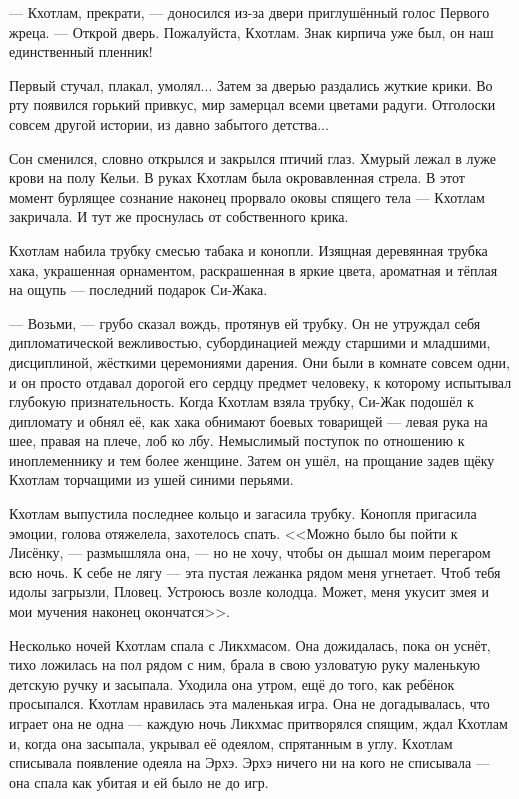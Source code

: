 --- Кхотлам, прекрати, --- доносился из-за двери приглушённый голос Первого жреца.
--- Открой дверь.
Пожалуйста, Кхотлам.
Знак кирпича уже был, он наш единственный пленник!

Первый стучал, плакал, умолял...
Затем за дверью раздались жуткие крики.
Во рту появился горький привкус, мир замерцал всеми цветами радуги.
Отголоски совсем другой истории, из давно забытого детства...

Сон сменился, словно открылся и закрылся птичий глаз.
Хмурый лежал в луже крови на полу Кельи.
В руках Кхотлам была окровавленная стрела.
В этот момент бурлящее сознание наконец прорвало оковы спящего тела --- Кхотлам закричала.
И тут же проснулась от собственного крика.

Кхотлам набила трубку смесью табака и конопли.
Изящная деревянная трубка хака, украшенная орнаментом, раскрашенная в яркие цвета, ароматная и тёплая на ощупь --- последний подарок Си-Жака.

--- Возьми, --- грубо сказал вождь, протянув ей трубку.
Он не утруждал себя дипломатической вежливостью, субординацией между старшими и младшими, дисциплиной, жёсткими церемониями дарения.
Они были в комнате совсем одни, и он просто отдавал дорогой его сердцу предмет человеку, к которому испытывал глубокую признательность.
Когда Кхотлам взяла трубку, Си-Жак подошёл к дипломату и обнял её, как хака обнимают боевых товарищей --- левая рука на шее, правая на плече, лоб ко лбу.
Немыслимый поступок по отношению к иноплеменнику и тем более женщине.
Затем он ушёл, на прощание задев щёку Кхотлам торчащими из ушей синими перьями.

Кхотлам выпустила последнее кольцо и загасила трубку.
Конопля пригасила эмоции, голова отяжелела, захотелось спать.
<<Можно было бы пойти к Лисёнку, --- размышляла она, --- но не хочу, чтобы он дышал моим перегаром всю ночь.
К себе не лягу --- эта пустая лежанка рядом меня угнетает.
Чтоб тебя идолы загрызли, Пловец.
Устроюсь возле колодца.
Может, меня укусит змея и мои мучения наконец окончатся>>.

Несколько ночей Кхотлам спала с Ликхмасом.
Она дожидалась, пока он уснёт, тихо ложилась на пол рядом с ним, брала в свою узловатую руку маленькую детскую ручку и засыпала.
Уходила она утром, ещё до того, как ребёнок просыпался.
Кхотлам нравилась эта маленькая игра.
Она не догадывалась, что играет она не одна --- каждую ночь Ликхмас притворялся спящим, ждал Кхотлам и, когда она засыпала, укрывал её одеялом, спрятанным в углу.
Кхотлам списывала появление одеяла на Эрхэ.
Эрхэ ничего ни на кого не списывала --- она спала как убитая и ей было не до игр.

